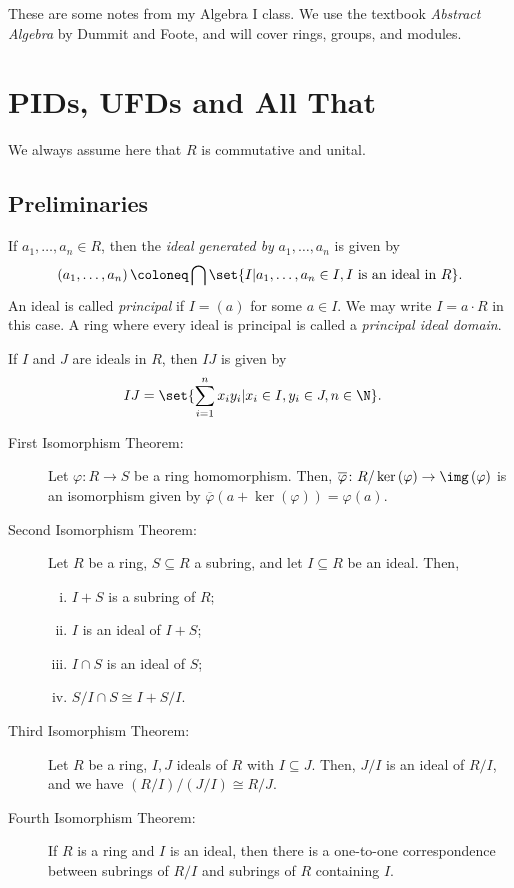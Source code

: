 \documentclass[10pt]{mypackage}
\begin{document}
\RaggedRight
These are some notes from my Algebra I class. We use the textbook \textit{Abstract Algebra} by Dummit and Foote, and will cover rings, groups, and modules.
\section{PIDs, UFDs and All That}%
We always assume here that $R$ is commutative and unital.
\subsection{Preliminaries}%
\begin{definition}
  If $a_1,\dots,a_n\in R$, then the \textit{ideal generated by} $a_1,\dots,a_n$ is given by
  \begin{align*}
    \left( a_1,\dots,a_n \right) \coloneq \bigcap\set{I | a_1,\dots,a_n\in I,I\text{ is an ideal in }R}.
  \end{align*}
  An ideal is called \textit{principal} if $I = \left( a \right)$ for some $a\in I$. We may write $I = a\cdot R$ in this case. A ring where every ideal is principal is called a \textit{principal ideal domain}.
\end{definition}
\begin{definition}
  If $I$ and $J$ are ideals in $R$, then $IJ$ is given by
  \begin{align*}
    IJ &= \set{\sum_{i=1}^{n}x_iy_i | x_i\in I, y_i\in J,n\in \N}.
  \end{align*}
\end{definition}
\begin{theorem}\hfill
  \begin{description}
    \item[First Isomorphism Theorem:] Let $\varphi\colon R\rightarrow S$ be a ring homomorphism. Then, $ \overline{\varphi}\colon R/\ker\left( \varphi \right)\rightarrow \img\left( \varphi \right) $ is an isomorphism given by $ \overline{\varphi}\left( a + \ker\left( \varphi \right) \right) = \varphi\left( a \right) $.
    \item[Second Isomorphism Theorem:] Let $R$ be a ring, $S\subseteq R$ a subring, and let $I\subseteq R$ be an ideal. Then,
      \begin{enumerate}[(i)]
        \item $I + S$ is a subring of $R$;
        \item $I$ is an ideal of $I + S$;
        \item $I\cap S$ is an ideal of $S$;
        \item $S/I\cap S \cong I + S/I$.
      \end{enumerate}
    \item[Third Isomorphism Theorem:] Let $R$ be a ring, $I,J$ ideals of $R$ with $I\subseteq J$. Then, $J/I$ is an ideal of $R/I$, and we have $\left( R/I \right)/\left( J/I \right) \cong R/J$.
    \item[Fourth Isomorphism Theorem:] If $R$ is a ring and $I$ is an ideal, then there is a one-to-one correspondence between subrings of $R/I$ and subrings of $R$ containing $I$.
  \end{description}
\end{theorem}
\end{document}
